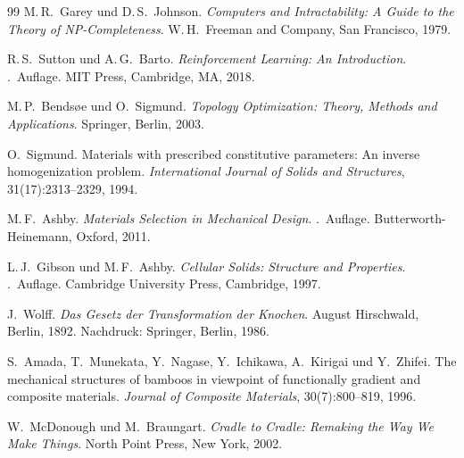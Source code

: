 \documentclass[a4paper,12pt]{article}
\theoremstyle{definition}
\begin{document}
\begin{thebibliography}{99}
M.\,R.~Garey und D.\,S.~Johnson.
\newblock \emph{Computers and Intractability: A Guide to the Theory of
  NP-Completeness}.
\newblock W.\,H.\ Freeman and Company, San Francisco, 1979.

R.\,S.~Sutton und A.\,G.~Barto.
\newblock \emph{Reinforcement Learning: An Introduction}.
.\ Auflage. MIT Press, Cambridge, MA, 2018.


M.\,P.~Bends\o{}e und O.~Sigmund.
\newblock \emph{Topology Optimization: Theory, Methods and Applications}.
\newblock Springer, Berlin, 2003.

O.~Sigmund.
\newblock Materials with prescribed constitutive parameters: An inverse
  homogenization problem.
\newblock \emph{International Journal of Solids and Structures},
  31(17):2313--2329, 1994.


M.\,F.~Ashby.
\newblock \emph{Materials Selection in Mechanical Design}.
.\ Auflage. Butterworth-Heinemann, Oxford, 2011.

L.\,J.~Gibson und M.\,F.~Ashby.
\newblock \emph{Cellular Solids: Structure and Properties}.
.\ Auflage. Cambridge University Press, Cambridge, 1997.

J.~Wolff.
\newblock \emph{Das Gesetz der Transformation der Knochen}.
\newblock August Hirschwald, Berlin, 1892.
\newblock Nachdruck: Springer, Berlin, 1986.

S.~Amada, T.~Munekata, Y.~Nagase, Y.~Ichikawa, A.~Kirigai und Y.~Zhifei.
\newblock The mechanical structures of bamboos in viewpoint of functionally
  gradient and composite materials.
\newblock \emph{Journal of Composite Materials}, 30(7):800--819, 1996.


W.~McDonough und M.~Braungart.
\newblock \emph{Cradle to Cradle: Remaking the Way We Make Things}.
\newblock North Point Press, New York, 2002.

\end{thebibliography}
\end{document}
